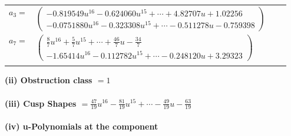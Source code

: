 \documentclass[1p]{elsarticle_modified}
\theoremstyle{definition}
\begin{document}
\begin{tabular}{m{7pt} m{180pt} m{7pt} m{180pt} }
\flushright $a_{3}=$&$\begin{pmatrix}-0.819549 u^{16}-0.624060 u^{15}+\cdots+4.82707 u+1.02256\\-0.0751880 u^{16}-0.323308 u^{15}+\cdots-0.511278 u-0.759398\end{pmatrix}$ \\
\flushright $a_{7}=$&$\begin{pmatrix}\frac{8}{7} u^{16}+\frac{5}{7} u^{15}+\cdots+\frac{46}{7} u-\frac{34}{7}\\-1.65414 u^{16}-0.112782 u^{15}+\cdots-0.248120 u+3.29323\end{pmatrix}$\\&\end{tabular}
\flushleft \textbf{(ii) Obstruction class $= 1$}\\~\\
\flushleft \textbf{(iii) Cusp Shapes $= \frac{47}{19} u^{16}-\frac{81}{19} u^{15}+\cdots-\frac{49}{19} u-\frac{63}{19}$}\\~\\
\newpage\renewcommand{\arraystretch}{1}
\flushleft \textbf{(iv) u-Polynomials at the component}\newline \\
\end{document}
